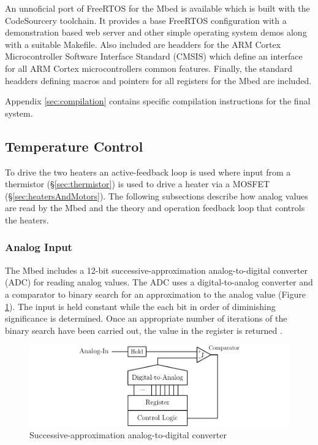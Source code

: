 			
			An unnoficial port of FreeRTOS for the Mbed is available which is built with
			the CodeSourcery toolchain. It provides a base FreeRTOS configuration with a
			demonstration \uIP{} based web server and other simple operating system
			demos along with a suitable Makefile. Also included are headders for the ARM
			Cortex Microcontroller Software Interface Standard (CMSIS) which define an
			interface for all ARM Cortex microcontrollers common features. Finally, the
			standard headders defining macros and pointers for all registers for the
			Mbed are included.
			
			Appendix \ref{sec:compilation} contains specific compilation instructions
			for the final system.
		
		\subsection{Temperature Control}
			
			To drive the two heaters an active-feedback loop is used where input from
			a thermistor (\S \ref{sec:thermistor}) is used to drive a heater via a
			MOSFET (\S \ref{sec:heatersAndMotors}). The following subsections describe
			how analog values are read by the Mbed and the theory and operation
			feedback loop that controls the heaters.
			
			\subsubsection{Analog Input}
				
				The Mbed includes a 12-bit successive-approximation analog-to-digital
				converter (ADC) for reading analog values\cite{LPC1768}. The ADC uses a
				digital-to-analog converter and a comparator to binary search for an
				approximation to the analog value (Figure \ref{fig:adc}). The input is
				held constant while the each bit in order of diminishing significance is
				determined. Once an appropriate number of iterations of the binary
				search have been carried out, the value in the register is returned
				\cite{maximadc}.
				
				\begin{figure}
					\includegraphics[width=1\textwidth]{diagrams/adc.pdf}
					\caption{Successive-approximation analog-to-digital converter}
					\label{fig:adc}
				\end{figure}
				
